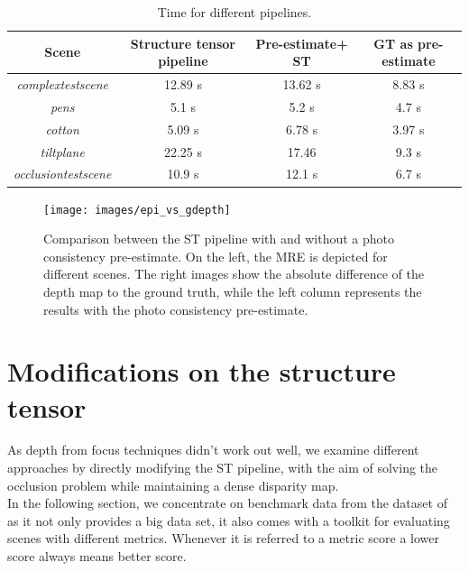 \documentclass  [
  paper    = a4,
  BCOR     = 10mm,
  twoside,
  fontsize = 12pt,
  fleqn,
  toc      = bibnumbered,
  toc      = listofnumbered,
  numbers  = noendperiod,
  headings = normal,
  listof   = leveldown,
  version  = 3.03
]                                       {scrreprt}
\begin{document}
 	\begin{table}
	\begin{tabular}{|c|c|c|c|}
		\hline 
		Scene & Structure tensor pipeline & Pre-estimate+ ST & GT as pre-estimate \\ 
		\hline 
		\textit{complextestscene} & 12.89 s & 13.62 s & 8.83 s \\ 
		\hline 
		\textit{pens} & 5.1 s & 5.2 s & 4.7 s \\ 
		\hline 
		\textit{cotton} & 5.09 s & 6.78 s & 3.97 s \\ 
		\hline 
		\textit{tiltplane} & 22.25 s & 17.46 &  9.3 s \\ 
		\hline 
		\textit{occlusiontestscene} & 10.9 s & 12.1 s & 6.7 s \\ 
		\hline 
		
	\end{tabular} 
\label{tab:time_gdepth}
\caption[Time for depth-of-focus techniques]{Time for different pipelines.}
 	\end{table}
 	\begin{figure}[h!]
 		\centering
 		\texttt{[image: images/epi\_vs\_gdepth]}
 		\caption[Photo-consistency pre-estimate for the structure tensor]{Comparison between the ST pipeline with and without a photo consistency pre-estimate. On the left, the MRE is depicted for different scenes. The right images show the absolute difference of the depth map to the ground truth, while the left column represents the results with the photo consistency pre-estimate.}
 		\label{fig:epivsgdepth}
 	\end{figure}
\newpage
\section{Modifications on the structure tensor}
As depth from focus techniques didn't work out well, we examine different approaches by directly modifying the ST pipeline, with the aim of solving the occlusion problem while maintaining a dense disparity map.\\
In the following section, we concentrate on benchmark data from the dataset of \cite{honauer2016benchmark} as it not only provides a big data set, it also comes with a toolkit for evaluating scenes with different metrics. Whenever it is referred to a metric score a lower score always means better score.
\end{document}
